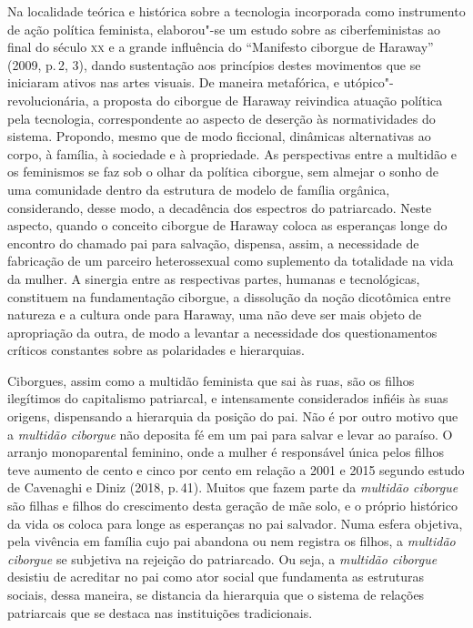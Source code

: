 Na localidade teórica e histórica sobre a tecnologia incorporada como
instrumento de ação política feminista, elaborou"-se um estudo sobre as
ciberfeministas ao final do século \textsc{xx} e a grande influência do ``Manifesto
ciborgue de Haraway'' (2009, p.\,2, 3), dando sustentação aos princípios
destes movimentos que se iniciaram ativos nas artes visuais. De maneira
metafórica, e utópico"-revolucionária, a proposta do ciborgue de Haraway
reivindica atuação política pela tecnologia, correspondente ao aspecto
de deserção às normatividades do sistema. Propondo, mesmo que de modo
ficcional, dinâmicas alternativas ao corpo, à família, à sociedade e à
propriedade. As perspectivas entre a multidão e os feminismos se faz sob
o olhar da política ciborgue, sem almejar o sonho de uma comunidade
dentro da estrutura de modelo de família orgânica, considerando, desse
modo, a decadência dos espectros do patriarcado. Neste aspecto, quando o
conceito ciborgue de Haraway coloca as esperanças longe do encontro do
chamado pai para salvação, dispensa, assim, a necessidade de fabricação
de um parceiro heterossexual como suplemento da totalidade na vida da
mulher. A sinergia entre as respectivas partes, humanas e tecnológicas,
constituem na fundamentação ciborgue, a dissolução da noção dicotômica
entre natureza e a cultura onde para Haraway, uma não deve ser mais
objeto de apropriação da outra, de modo a levantar a necessidade dos
questionamentos críticos constantes sobre as polaridades e hierarquias.

Ciborgues, assim como a multidão feminista que sai às ruas, são os
filhos ilegítimos do capitalismo patriarcal, e intensamente considerados
infiéis às suas origens, dispensando a hierarquia da posição do pai. Não
é por outro motivo que a \textit{multidão ciborgue} não deposita fé em um pai
para salvar e levar ao paraíso. O arranjo monoparental feminino, onde a
mulher é responsável única pelos filhos teve aumento de cento e cinco
por cento em relação a 2001 e 2015 segundo estudo de Cavenaghi e Diniz
(2018, p.\,41). Muitos que fazem parte da \textit{multidão ciborgue} são filhas e
filhos do crescimento desta geração de mãe solo, e o próprio histórico
da vida os coloca para longe as esperanças no pai salvador. Numa esfera
objetiva, pela vivência em família cujo pai abandona ou nem registra os
filhos, a \textit{multidão ciborgue} se subjetiva na rejeição do patriarcado. Ou
seja, a \textit{multidão ciborgue} desistiu de acreditar no pai como ator social
que fundamenta as estruturas sociais, dessa maneira, se distancia da
hierarquia que o sistema de relações patriarcais que se destaca nas
instituições tradicionais.

